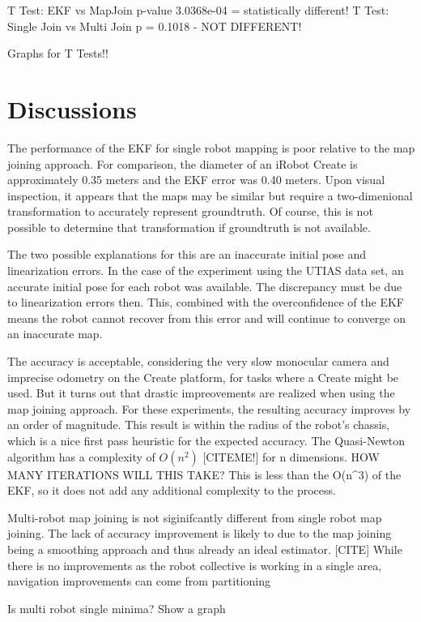 \documentclass[12pt]{report}
\begin{document}
T Test: EKF vs MapJoin
p-value 3.0368e-04  = statistically different!
T Test: Single Join vs Multi Join  p = 0.1018 - NOT DIFFERENT!

Graphs for T Tests!!

\chapter{Discussions}

	The performance of the EKF for single robot mapping is poor relative to the map joining approach.  For comparison, the diameter of an iRobot Create is approximately 0.35 meters and the EKF error was 0.40 meters.  Upon visual inspection, it appears that the maps may be similar but require a two-dimenional transformation to accurately represent groundtruth.  Of course, this is not possible to determine that transformation if groundtruth is not available.

	The two possible explanations for this are an inaccurate initial pose and linearization errors.  In the case of the experiment using the UTIAS data set, an accurate initial pose for each robot was available.  The discrepancy must be due to linearization errors then.  This, combined with the overconfidence of the EKF means the robot cannot recover from this error and will continue to converge on an inaccurate map.  

	The accuracy is acceptable, considering the very slow monocular camera and imprecise odometry on the Create platform, for tasks where a Create might be used.  But it turns out that drastic impreovements are realized when using the map joining approach.  For these experiments, the resulting accuracy improves by an order of magnitude.  This result is within the radius of the robot's chassis, which is a nice first pass heuristic for the expected accuracy.  The Quasi-Newton algorithm has a complexity of $O(n^2)$ [CITEME!] for n dimensions.  HOW MANY ITERATIONS WILL THIS TAKE?  This is less than the O(n^3) of the EKF, so it does not add any additional complexity to the process.  

	Multi-robot map joining is not siginifcantly different from single robot map joining.  The lack of accuracy improvement is likely to due to the map joining being a smoothing approach and thus already an ideal estimator.  [CITE]  While there is no improvements as the robot collective is working in a single area,  navigation improvements can come from partitioning 

Is multi robot single minima?  Show a graph
\end{document}
